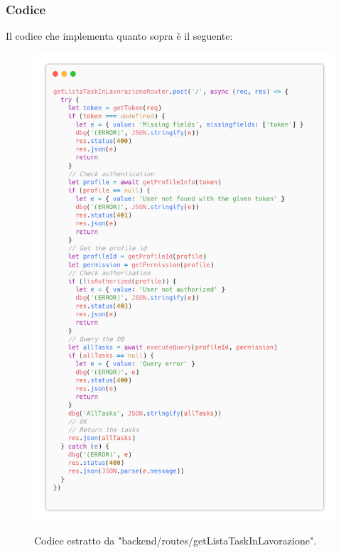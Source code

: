 \documentclass{report}
\begin{document}
\subsubsection*{Codice}

Il codice che implementa quanto sopra è il seguente:

\begin{figure}[H]
	\centering\includegraphics[width=1\textwidth]{images/code_in_lavorazione.png}
	
	Codice estratto da "backend/routes/getListaTaskInLavorazione".
\end{figure}
\end{document}
